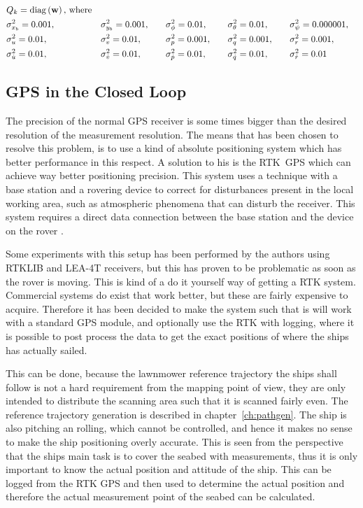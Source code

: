 \begin{alignat*}{5}
&Q_k = \mathrm{diag}\left(\mathbf{w}\right) \text{, where} \\ \nonumber
&\sigma_{x_{b}}^2 = 0.001,\quad& &\sigma_{y_{b}}^2 = 0.001,\quad& &\sigma_{\phi}^2 = 0.01,\quad& &\sigma_{\theta}^2 = 0.01,\quad& &\sigma_{\psi}^2 = 0.000001,\\ \nonumber
&\sigma_{u}^2 = 0.01,\quad& &\sigma_{v}^2 = 0.01,\quad& &\sigma_{p}^2 = 0.001,\quad& &\sigma_{q}^2 = 0.001,\quad& &\sigma_{r}^2 = 0.001,\\ \nonumber
&\sigma_{\dot u}^2 = 0.01,\quad& &\sigma_{\dot v}^2 = 0.01,\quad& &\sigma_{\dot p}^2 = 0.01,\quad& &\sigma_{\dot q}^2 = 0.01,\quad& &\sigma_{\dot r}^2 = 0.01
\end{alignat*}

\subsection{GPS in the Closed Loop}
The precision of the normal \ac{GPS} receiver is some times bigger than the desired resolution of the measurement resolution. The means that has been chosen to resolve this problem, is to use a kind of absolute positioning system which has better performance in this respect. A solution to his is the \ac{RTK}\ \ac{GPS} which can achieve way better positioning precision. This system uses a technique with a base station and a rovering device to correct for disturbances present in the local working area, such as atmospheric phenomena that can disturb the receiver. This system requires a direct data connection between the base station and the device on the rover \citep{rtk}.

Some experiments with this setup has been performed by the authors
using RTKLIB and LEA-4T receivers, but this has proven to be
problematic as soon as the rover is moving. This is kind of a do it
yourself way of getting a \ac{RTK} system. Commercial systems do exist
that work better, but these are fairly expensive to acquire. Therefore
it has been decided to make the system such that is will work with a
standard \ac{GPS} module, and optionally use the \ac{RTK} with logging,
where it is possible to post process the data to get the exact
positions of where the ships has actually sailed.

This can be done, because the lawnmower reference trajectory the ships
shall follow is not a hard requirement from the mapping point of view,
they are only intended to distribute the scanning area such that it is
scanned fairly even. The reference trajectory generation is described
in chapter~\vref{ch:pathgen}. The ship is also pitching an rolling,
which cannot be controlled, and hence it makes no sense to make the
ship positioning overly accurate. This is seen from the perspective
that the ships main task is to cover the seabed with measurements,
thus it is only important to know the actual position and attitude of
the ship. This can be logged from the \ac{RTK} \ac{GPS} and then used
to determine the actual position and therefore the actual measurement
point of the seabed can be calculated.

